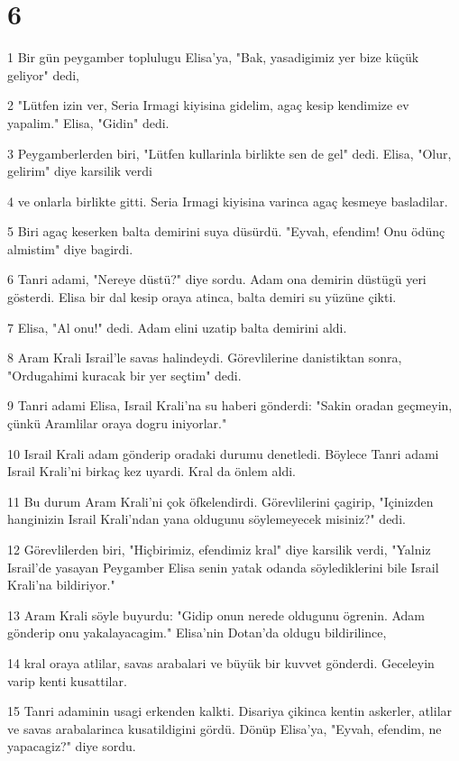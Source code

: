 \chapter{6}

\par 1 Bir gün peygamber toplulugu Elisa'ya, "Bak, yasadigimiz yer bize küçük geliyor" dedi,
\par 2 "Lütfen izin ver, Seria Irmagi kiyisina gidelim, agaç kesip kendimize ev yapalim." Elisa, "Gidin" dedi.
\par 3 Peygamberlerden biri, "Lütfen kullarinla birlikte sen de gel" dedi. Elisa, "Olur, gelirim" diye karsilik verdi
\par 4 ve onlarla birlikte gitti. Seria Irmagi kiyisina varinca agaç kesmeye basladilar.
\par 5 Biri agaç keserken balta demirini suya düsürdü. "Eyvah, efendim! Onu ödünç almistim" diye bagirdi.
\par 6 Tanri adami, "Nereye düstü?" diye sordu. Adam ona demirin düstügü yeri gösterdi. Elisa bir dal kesip oraya atinca, balta demiri su yüzüne çikti.
\par 7 Elisa, "Al onu!" dedi. Adam elini uzatip balta demirini aldi.
\par 8 Aram Krali Israil'le savas halindeydi. Görevlilerine danistiktan sonra, "Ordugahimi kuracak bir yer seçtim" dedi.
\par 9 Tanri adami Elisa, Israil Krali'na su haberi gönderdi: "Sakin oradan geçmeyin, çünkü Aramlilar oraya dogru iniyorlar."
\par 10 Israil Krali adam gönderip oradaki durumu denetledi. Böylece Tanri adami Israil Krali'ni birkaç kez uyardi. Kral da önlem aldi.
\par 11 Bu durum Aram Krali'ni çok öfkelendirdi. Görevlilerini çagirip, "Içinizden hanginizin Israil Krali'ndan yana oldugunu söylemeyecek misiniz?" dedi.
\par 12 Görevlilerden biri, "Hiçbirimiz, efendimiz kral" diye karsilik verdi, "Yalniz Israil'de yasayan Peygamber Elisa senin yatak odanda söylediklerini bile Israil Krali'na bildiriyor."
\par 13 Aram Krali söyle buyurdu: "Gidip onun nerede oldugunu ögrenin. Adam gönderip onu yakalayacagim." Elisa'nin Dotan'da oldugu bildirilince,
\par 14 kral oraya atlilar, savas arabalari ve büyük bir kuvvet gönderdi. Geceleyin varip kenti kusattilar.
\par 15 Tanri adaminin usagi erkenden kalkti. Disariya çikinca kentin askerler, atlilar ve savas arabalarinca kusatildigini gördü. Dönüp Elisa'ya, "Eyvah, efendim, ne yapacagiz?" diye sordu.
